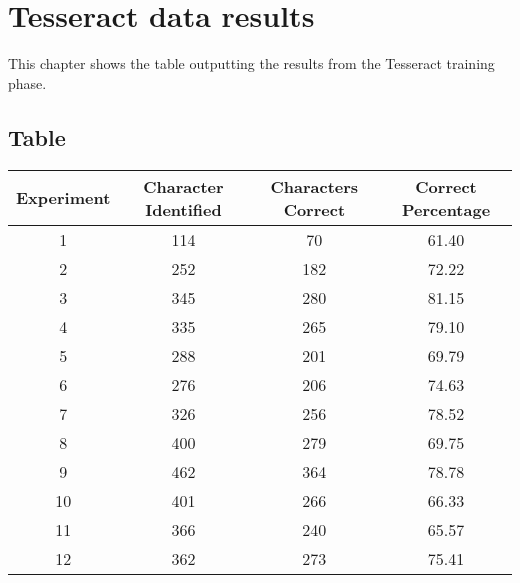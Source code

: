 \chapter{Tesseract data results}
This chapter shows the table outputting the results from the Tesseract training phase.

\section{Table}
\label{appendix:tesseract_table}

\begin{table}[h!]
\centering
 \begin{tabular}{||c c c c||}
 \hline
 Experiment & Character Identified & Characters Correct & Correct Percentage \\ [0.5ex]
 \hline\hline
 1 & 114 & 70  & 61.40 \\
 2 & 252 & 182 & 72.22 \\
 3 & 345 & 280 & 81.15 \\
 4 & 335 & 265 & 79.10 \\
 5 & 288 & 201 & 69.79 \\
 6 & 276 & 206 & 74.63 \\
 7 & 326 & 256 & 78.52 \\
 8 & 400 & 279 & 69.75 \\
 9 & 462 & 364 & 78.78 \\
 10 & 401 & 266 & 66.33 \\
 11 & 366 & 240 & 65.57 \\
 12 & 362 & 273 & 75.41 \\ [1ex]
 \hline
 \end{tabular}
\end{table}
